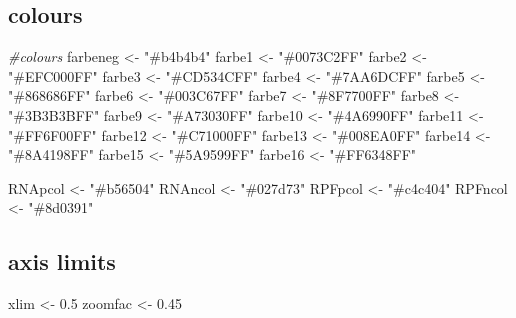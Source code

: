 \documentclass[
]{article}
\newenvironment{Shaded}{\begin{snugshade}}{\end{snugshade}}
\newcommand{\CommentTok}[1]{\textcolor[rgb]{0.56,0.35,0.01}{\textit{#1}}}
\newcommand{\FloatTok}[1]{\textcolor[rgb]{0.00,0.00,0.81}{#1}}
\newcommand{\NormalTok}[1]{#1}
\newcommand{\OtherTok}[1]{\textcolor[rgb]{0.56,0.35,0.01}{#1}}
\newcommand{\StringTok}[1]{\textcolor[rgb]{0.31,0.60,0.02}{#1}}
\begin{document}
\hypertarget{colours}{%
\subsection{colours}\label{colours}}

\begin{Shaded}
\begin{Highlighting}[]
\CommentTok{\#colours}
\NormalTok{farbeneg }\OtherTok{\textless{}{-}} \StringTok{"\#b4b4b4"}
\NormalTok{farbe1 }\OtherTok{\textless{}{-}} \StringTok{"\#0073C2FF"}
\NormalTok{farbe2 }\OtherTok{\textless{}{-}} \StringTok{"\#EFC000FF"}
\NormalTok{farbe3 }\OtherTok{\textless{}{-}} \StringTok{"\#CD534CFF"}
\NormalTok{farbe4 }\OtherTok{\textless{}{-}} \StringTok{"\#7AA6DCFF"}
\NormalTok{farbe5 }\OtherTok{\textless{}{-}} \StringTok{"\#868686FF"}
\NormalTok{farbe6 }\OtherTok{\textless{}{-}} \StringTok{"\#003C67FF"}
\NormalTok{farbe7 }\OtherTok{\textless{}{-}} \StringTok{"\#8F7700FF"}
\NormalTok{farbe8 }\OtherTok{\textless{}{-}} \StringTok{"\#3B3B3BFF"}
\NormalTok{farbe9 }\OtherTok{\textless{}{-}} \StringTok{"\#A73030FF"}
\NormalTok{farbe10 }\OtherTok{\textless{}{-}} \StringTok{"\#4A6990FF"}
\NormalTok{farbe11 }\OtherTok{\textless{}{-}} \StringTok{"\#FF6F00FF"}
\NormalTok{farbe12 }\OtherTok{\textless{}{-}} \StringTok{"\#C71000FF"}
\NormalTok{farbe13 }\OtherTok{\textless{}{-}} \StringTok{"\#008EA0FF"}
\NormalTok{farbe14 }\OtherTok{\textless{}{-}} \StringTok{"\#8A4198FF"}
\NormalTok{farbe15 }\OtherTok{\textless{}{-}} \StringTok{"\#5A9599FF"}
\NormalTok{farbe16 }\OtherTok{\textless{}{-}} \StringTok{"\#FF6348FF"}
  
\NormalTok{RNApcol }\OtherTok{\textless{}{-}} \StringTok{"\#b56504"}
\NormalTok{RNAncol }\OtherTok{\textless{}{-}} \StringTok{"\#027d73"}
\NormalTok{RPFpcol }\OtherTok{\textless{}{-}} \StringTok{"\#c4c404"}
\NormalTok{RPFncol }\OtherTok{\textless{}{-}} \StringTok{"\#8d0391"}
\end{Highlighting}
\end{Shaded}

\hypertarget{axis-limits}{%
\subsection{axis limits}\label{axis-limits}}

\begin{Shaded}
\begin{Highlighting}[]
\NormalTok{xlim }\OtherTok{\textless{}{-}} \FloatTok{0.5}
\NormalTok{zoomfac }\OtherTok{\textless{}{-}} \FloatTok{0.45}
\end{Highlighting}
\end{Shaded}
\end{document}
